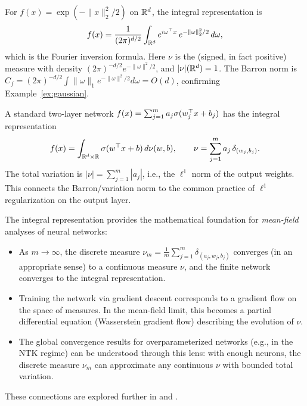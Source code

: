 \documentclass[11pt,a4paper]{article}
\begin{document}
\begin{example}
\label{ex:gaussian-integral}
For $f(x) = \exp(-\|x\|_2^2/2)$ on $\mathbb{R}^d$, the integral representation is
\[
  f(x) = \frac{1}{(2\pi)^{d/2}} \int_{\mathbb{R}^d}
  e^{i\omega^\top x} \, e^{-\|\omega\|_2^2/2} \, d\omega,
\]
which is the Fourier inversion formula.  Here $\nu$ is the (signed,
in fact positive) measure with density $(2\pi)^{-d/2} e^{-\|\omega\|^2/2}$,
and $|\nu|(\mathbb{R}^d) = 1$.  The Barron norm is
$C_f = (2\pi)^{-d/2} \int \|\omega\|_1 e^{-\|\omega\|^2/2} d\omega
= O(d)$, confirming Example~\ref{ex:gaussian}.
\end{example}

\begin{example}
\label{ex:finite-integral}
A standard two-layer network $f(x) = \sum_{j=1}^m a_j \sigma(w_j^\top x
+ b_j)$ has the integral representation
\[
  f(x) = \int_{\mathbb{R}^d \times \mathbb{R}} \sigma(w^\top x + b) \,
  d\nu(w, b),
  \qquad
  \nu = \sum_{j=1}^{m} a_j \, \delta_{(w_j, b_j)}.
\]
The total variation is $|\nu| = \sum_{j=1}^m |a_j|$, i.e., the $\ell^1$
norm of the output weights.  This connects the Barron/variation norm to
the common practice of $\ell^1$ regularization on the output layer.
\end{example}

\begin{rlconnection}[title={Mean-Field Limits and Overparameterization}]
The integral representation provides the mathematical foundation for
\emph{mean-field} analyses of neural networks:
\begin{itemize}[nosep]
  \item As $m \to \infty$, the discrete measure
    $\nu_m = \frac{1}{m} \sum_{j=1}^m \delta_{(a_j, w_j, b_j)}$
    converges (in an appropriate sense) to a continuous measure $\nu$,
    and the finite network converges to the integral representation.
  \item Training the network via gradient descent corresponds to a
    gradient flow on the space of measures.  In the mean-field limit,
    this becomes a partial differential equation
    (Wasserstein gradient flow) describing the evolution of $\nu$.
  \item The global convergence results for overparameterized networks
    (e.g., in the NTK regime) can be understood through this lens: with
    enough neurons, the discrete measure $\nu_m$ can approximate any
    continuous $\nu$ with bounded total variation.
\end{itemize}
These connections are explored further in \citet{chizat2018} and
\citet{mei2018}.
\end{rlconnection}
\end{document}
